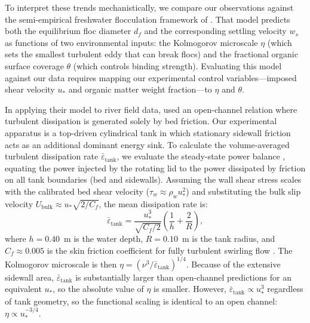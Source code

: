 \documentclass{agujournal2019}
\begin{document}
To interpret these trends mechanistically, we compare our observations against the semi-empirical freshwater flocculation framework of . That model predicts both the equilibrium floc diameter $d_f$ and the corresponding settling velocity $w_s$ as functions of two environmental inputs: the Kolmogorov microscale $\eta$ (which sets the smallest turbulent eddy that can break flocs) and the fractional organic surface coverage $\theta$ (which controls binding strength). Evaluating this model against our data requires mapping our experimental control variables---imposed shear velocity $u_*$ and organic matter weight fraction---to $\eta$ and $\theta$.

In applying their model to river field data,  used an open-channel relation where turbulent dissipation is generated solely by bed friction. Our experimental apparatus is a top-driven cylindrical tank in which stationary sidewall friction acts as an additional dominant energy sink. To calculate the volume-averaged turbulent dissipation rate $\bar{\varepsilon}_{\text{tank}}$, we evaluate the steady-state power balance \cite{camp1943velocity}, equating the power injected by the rotating lid to the power dissipated by friction on all tank boundaries (bed and sidewalls). Assuming the wall shear stress scales with the calibrated bed shear velocity ($\tau_w \approx \rho_w u_*^2$) \cite{Pope2000, Schlichting2000} and substituting the bulk slip velocity $U_{\text{bulk}} \approx u_* \sqrt{2/C_f}$, the mean dissipation rate is:
\begin{equation}
    \bar{\varepsilon}_{\text{tank}} = \frac{u_*^3}{\sqrt{C_f/2}} \left( \frac{1}{h} + \frac{2}{R} \right),
    \label{eq:eps_tank}
\end{equation}
where $h = 0.40$~m is the water depth, $R = 0.10$~m is the tank radius, and $C_f \approx 0.005$ is the skin friction coefficient for fully turbulent swirling flow \cite{daily1960chamber, Schlichting2000}. The Kolmogorov microscale is then $\eta = (\nu^3 / \bar{\varepsilon}_{\text{tank}})^{1/4}$. Because of the extensive sidewall area, $\bar{\varepsilon}_{\text{tank}}$ is substantially larger than open-channel predictions for an equivalent $u_*$, so the absolute value of $\eta$ is smaller. However, $\bar{\varepsilon}_{\text{tank}} \propto u_*^3$ regardless of tank geometry, so the functional scaling is identical to an open channel: $\eta \propto u_*^{-3/4}$.
\end{document}
